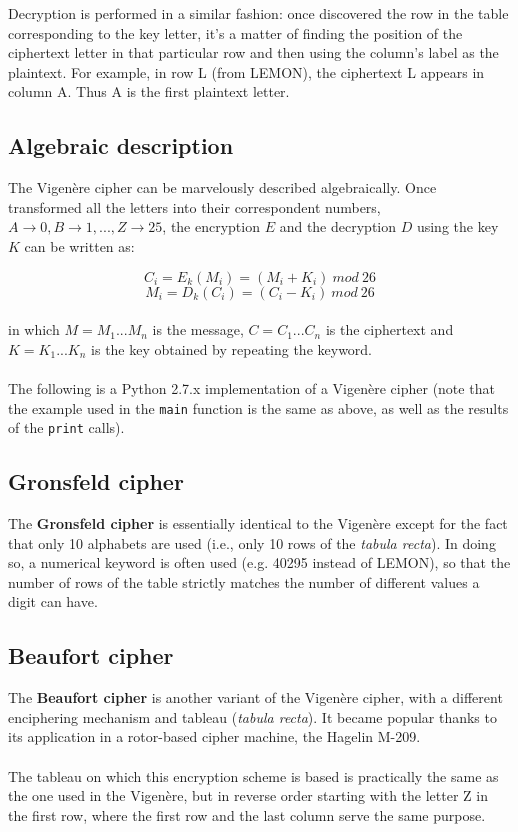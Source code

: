 \documentclass[Lau,binding=0.6cm,oneside]{sapthesis}
\begin{document}
Decryption is performed in a similar fashion: once discovered the row in the table corresponding to the key letter, it's a matter of finding the position of the ciphertext letter in that particular row and then using the column's label as the plaintext. For example, in row \textsf{L} (from \textsf{LEMON}), the ciphertext \textsf{L} appears in column \textsf{A}. Thus \textsf{A} is the first plaintext letter.

\subsection{Algebraic description}
The Vigenère cipher can be marvelously described algebraically. Once transformed all the letters into their correspondent numbers, $A \rightarrow 0, B \rightarrow 1, ... , Z \rightarrow 25$, the encryption $E$ and the decryption $D$ using the key $K$ can be written as:

\begin{equation}
C_i=E_k{(M_i)}=(M_i + K_i) \ mod \ 26
\end{equation}
\begin{equation}
M_i=D_k{(C_i)}=(C_i - K_i) \ mod \ 26
\end{equation}
\ \\
in which $M = M_1 ... M_n$ is the message, $C = C_1 ... C_n$ is the ciphertext and $K = K_1 ... K_n$ is the key obtained by repeating the keyword.\\\\
The following is a \textsf{Python 2.7.x} implementation of a Vigenère cipher (note that the example used in the \texttt{main} function is the same as above, as well as the results of the \texttt{print} calls).
\ \\
\subsection{Gronsfeld cipher}
The \textbf{Gronsfeld cipher} is essentially identical to the Vigenère except for the fact that only 10 alphabets are used (i.e., only 10 rows of the \textit{tabula recta}). In doing so, a numerical keyword is often used (e.g. \textsf{40295} instead of \textsf{LEMON}), so that the number of rows of the table strictly matches the number of different values a digit can have.

\subsection{Beaufort cipher}
The \textbf{Beaufort cipher} is another variant of the Vigenère cipher, with a different enciphering mechanism and tableau (\textit{tabula recta}). It became popular thanks to its application in a rotor-based cipher machine, the Hagelin M-209.\\\\
The tableau on which this encryption scheme is based is practically the same as the one used in the Vigenère, but in reverse order starting with the letter \textsf{Z} in the first row, where the first row and the last column serve the same purpose.\\\\
\end{document}
